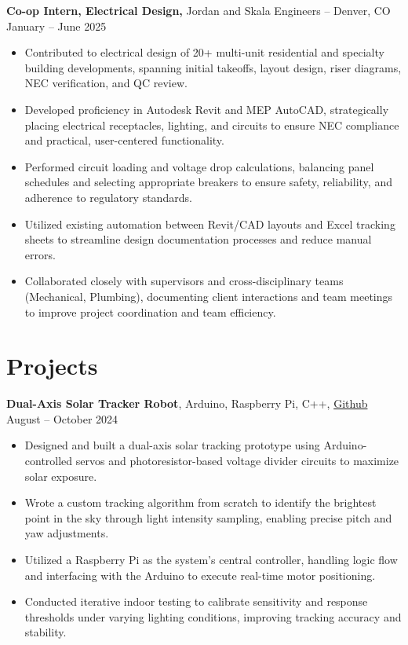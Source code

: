 \documentclass[11pt]{article}
\begin{document}
\textbf{Co-op Intern, Electrical Design, }{Jordan and Skala Engineers} -- Denver, CO \hfill January -- June 2025 \\
\vspace{-5pt}
\begin{itemize}
  \item Contributed to electrical design of 20+ multi-unit residential and specialty building developments, spanning initial takeoffs, layout design, riser diagrams, NEC verification, and QC review.
  \item Developed proficiency in Autodesk Revit and MEP AutoCAD, strategically placing electrical receptacles, lighting, and circuits to ensure NEC compliance and practical, user-centered functionality.
  \item Performed circuit loading and voltage drop calculations, balancing panel schedules and selecting appropriate breakers to ensure safety, reliability, and adherence to regulatory standards.
  \item Utilized existing automation between Revit/CAD layouts and Excel tracking sheets to streamline design documentation processes and reduce manual errors.
  \item Collaborated closely with supervisors and cross-disciplinary teams (Mechanical, Plumbing), documenting client interactions and team meetings to improve project coordination and team efficiency.
\end{itemize}

\vspace{-14pt}
\section*{Projects}
\vspace{5pt}
\textbf{Dual-Axis Solar Tracker Robot}, Arduino, Raspberry Pi, C++, \href{https://github.com/edwardasilva/SolarPanelProject}{Github} \hfill August -- October 2024
\vspace{-5pt}
\begin{itemize}
  \item Designed and built a dual-axis solar tracking prototype using Arduino-controlled servos and photoresistor-based voltage divider circuits to maximize solar exposure.
  \item Wrote a custom tracking algorithm from scratch to identify the brightest point in the sky through light intensity sampling, enabling precise pitch and yaw adjustments.
  \item Utilized a Raspberry Pi as the system's central controller, handling logic flow and interfacing with the Arduino to execute real-time motor positioning.
  \item Conducted iterative indoor testing to calibrate sensitivity and response thresholds under varying lighting conditions, improving tracking accuracy and stability.
\end{itemize}
\end{document}
